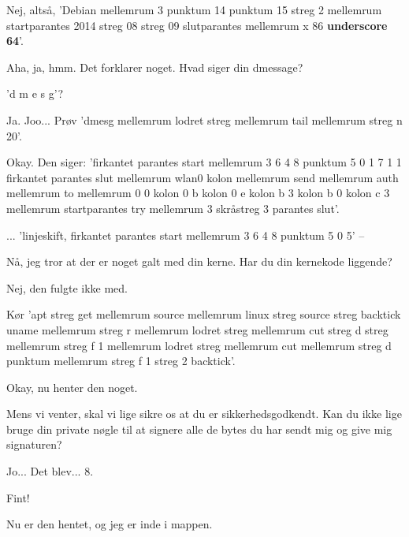 \documentclass[a4paper,11pt]{article}
\begin{document}
\begin{sketch}

 Nej, altså, 'Debian mellemrum 3 punktum 14 punktum 15 streg 2
mellemrum startparantes 2014 streg 08 streg 09 slutparantes mellemrum x 86
\textbf{underscore 64}'.


 Aha, ja, hmm.  Det forklarer noget.  Hvad siger din dmessage?

 'd m e s g'?

 Ja.  Joo...  Prøv 'dmesg mellemrum lodret streg mellemrum tail
mellemrum streg n 20'.

  Okay.  Den siger: 'firkantet parantes start mellemrum
3 6 4 8 punktum 5 0 1 7 1 1 firkantet parantes slut mellemrum wlan0 kolon
mellemrum send mellemrum auth mellemrum to mellemrum 0 0 kolon 0 b kolon 0 e
kolon b 3 kolon b 0 kolon c 3 mellemrum startparantes try mellemrum 3 skråstreg
3 parantes slut'.


 ... 'linjeskift, firkantet parantes start mellemrum 3 6 4 8 punktum 5 0
5' --

\scene{\texttt{linjeskift, [ 3648.505}}

  Nå, jeg tror at der er noget galt med din kerne.  Har du
din kernekode liggende?

 Nej, den fulgte ikke med.

 Kør 'apt streg get mellemrum source mellemrum linux streg source
streg backtick uname mellemrum streg r mellemrum lodret streg mellemrum cut
streg d streg mellemrum streg f 1 mellemrum lodret streg mellemrum cut mellemrum
streg d punktum mellemrum streg f 1 streg 2 backtick'.


 Okay, nu henter den noget.

 Mens vi venter, skal vi lige sikre os at du er
sikkerhedsgodkendt.  Kan du ikke lige bruge din private nøgle til at
signere alle de bytes du har sendt mig og give mig signaturen?

 Jo...  Det blev... 8.

 Fint!

 Nu er den hentet, og jeg er inde i mappen.


\end{sketch}
\end{document}
